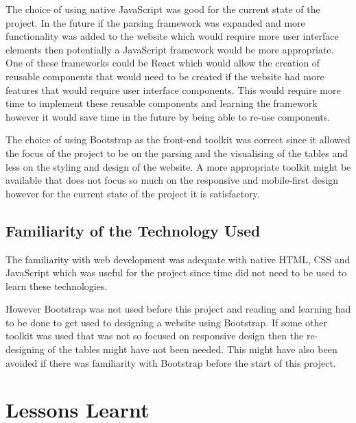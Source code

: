 The choice of using native JavaScript was good for the current state of the project. In the future if the parsing framework was expanded and more functionality was added to the website which would require more user interface elements then potentially a JavaScript framework would be more appropriate. One of these frameworks could be React which would allow the creation of reusable components that would need to be created if the website had more features that would require user interface components. This would require more time to implement these reusable components and learning the framework however it would save time in the future by being able to re-use components. 

The choice of using Bootstrap as the front-end toolkit was correct since it allowed the focus of the project to be on the parsing and the visualising of the tables and less on the styling and design of the website. A more appropriate toolkit might be available that does not focus so much on the responsive and mobile-first design however for the current state of the project it is satisfactory. 

\subsection{Familiarity of the Technology Used}

The familiarity with web development was adequate with native HTML, CSS and JavaScript which was useful for the project since time did not need to be used to learn these technologies. 

However Bootstrap was not used before this project and reading and learning had to be done to get used to designing a website using Bootstrap. If some other toolkit was used that was not so focused on responsive design then the re-designing of the tables might have not been needed. This might have also been avoided if there was familiarity with Bootstrap before the start of this project. 




\section{Lessons Learnt}

